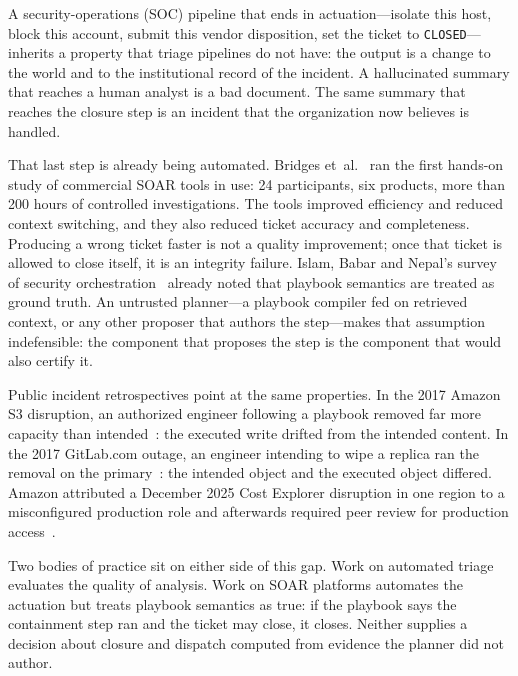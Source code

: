 \documentclass[acmsmall,manuscript,review,anonymous]{acmart}
\renewcommand{\_}{\discretionary{\textunderscore}{}{\textunderscore}}
\begin{document}
A security-operations (SOC) pipeline that ends in actuation---isolate this host,
block this account, submit this vendor disposition, set the ticket to
\texttt{CLOSED}---inherits a property that triage pipelines do not have: the
output is a change to the world and to the institutional record of the
incident. A hallucinated summary that reaches a human analyst is a bad
document. The same summary that reaches the closure step is an incident that
the organization now believes is handled.

That last step is already being automated. Bridges
et~al.~\cite{bridges2023testing} ran the first hands-on study of commercial
SOAR tools in use: 24 participants, six products, more than 200 hours of
controlled investigations. The tools improved efficiency and reduced context
switching, and they also reduced ticket accuracy and completeness. Producing a wrong ticket faster is not a
quality improvement; once that ticket is allowed to close itself, it is an
integrity failure. Islam, Babar and Nepal's survey of security
orchestration~\cite{islam2019orchestration} already noted that playbook
semantics are treated as ground truth. An untrusted planner---a playbook
compiler fed on retrieved context, or any other proposer that authors the
step---makes that assumption indefensible: the component that proposes the
step is the component that would also certify it.

Public incident retrospectives point at the same properties. In the 2017
{Amazon S3} disruption, an authorized engineer following a playbook
removed far more capacity than intended~\cite{aws2017s3}: the executed
write drifted from the intended content. In the 2017 {GitLab.com} outage,
an engineer intending to wipe a replica ran the removal on the
primary~\cite{gitlab2017db}: the intended object and the executed object
differed. {Amazon} attributed a December 2025 {Cost Explorer} disruption
in one region to a misconfigured production role and
afterwards required peer review for production
access~\cite{amazon2026kiro}.

Two bodies of practice sit on either side of this gap. Work on automated
triage evaluates the quality of analysis. Work on SOAR platforms automates
the actuation but treats playbook semantics as true: if the playbook says
the containment step ran and the ticket may close, it closes. Neither
supplies a decision about closure and dispatch computed from evidence the
planner did not author.
\end{document}
